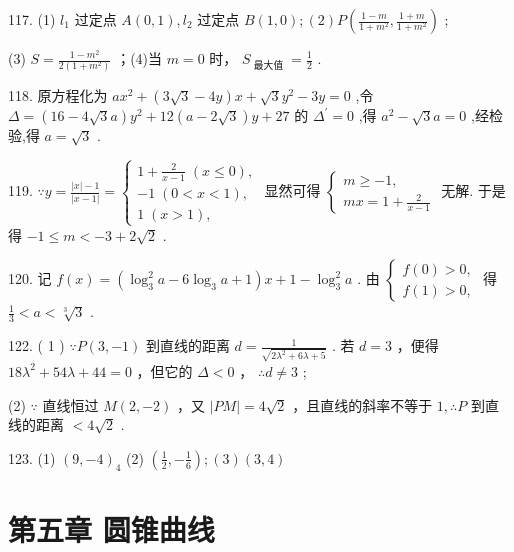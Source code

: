 \documentclass[10pt]{article}
\begin{document}
117. (1) \({l}_{1}\) 过定点 \(A\left( {0,1}\right) ,{l}_{2}\) 过定点 \(B\left( {1,0}\right) ;\left( 2\right) P\left( {\frac{1 - m}{1 + {m}^{2}},\frac{1 + m}{1 + {m}^{2}}}\right)\) ;

(3) \(S = \frac{1 - {m}^{2}}{2\left( {1 + {m}^{2}}\right) }\) ；(4)当 \(m = 0\) 时， \({S}_{\text{ 最大值 }} = \frac{1}{2}\) .

118. 原方程化为 \(a{x}^{2} + \left( {3\sqrt{3} - {4y}}\right) x + \sqrt{3}{y}^{2} - {3y} = 0\) ,令 \(\Delta  = \left( {{16} - 4\sqrt{3}a}\right) {y}^{2} + {12}\left( {a - 2\sqrt{3}}\right) y + {27}\) 的 \({\Delta }^{\prime } = 0\) ,得 \({a}^{2} - \sqrt{3}a = 0\) ,经检验,得 \(a = \sqrt{3}\) .

119. \(\because y = \frac{\left| x\right|  - 1}{\left| x - 1\right| } = \left\{  \begin{array}{l} 1 + \frac{2}{x - 1}\;\left( {x \leq  0}\right) , \\   - 1\;\left( {0 < x < 1}\right) , \\  1\;\left( {x > 1}\right) , \end{array}\right.\) 显然可得 \(\left\{  \begin{array}{l} m \geq   - 1, \\  {mx} = 1 + \frac{2}{x - 1} \end{array}\right.\) 无解. 于是得 \(- 1 \leq  m <  - 3 + 2\sqrt{2}\) .

120. 记 \(f\left( x\right)  = \left( {{\log }_{3}^{2}a - 6{\log }_{3}a + 1}\right) x + 1 - {\log }_{3}^{2}a\) . 由 \(\left\{  \begin{array}{l} f\left( 0\right)  > 0, \\  f\left( 1\right)  > 0, \end{array}\right.\) 得 \(\frac{1}{3} < a < \sqrt[3]{3}\) .

122. ( 1 ) \(\because P\left( {3, - 1}\right)\) 到直线的距离 \(d = \frac{1}{\sqrt{2{\lambda }^{2} + {6\lambda } + 5}}\) . 若 \(d = 3\) ，便得 \({18}{\lambda }^{2} + {54\lambda } + {44} = 0\) ，但它的 \(\Delta  < 0\) ， \(\therefore d \neq  3\) ;

(2) \(\because\) 直线恒过 \(M\left( {2, - 2}\right)\) ，又 \(\left| {PM}\right|  = 4\sqrt{2}\) ，且直线的斜率不等于 \(1,\therefore P\) 到直线的距离 \(< 4\sqrt{2}\) .

123. (1) \({\left( 9, - 4\right) }_{4}\) (2) \(\left( {\frac{1}{2}, - \frac{1}{6}}\right) ;\left( 3\right) \left( {3,4}\right)\)

\section*{第五章 圆锥曲线}
\end{document}
